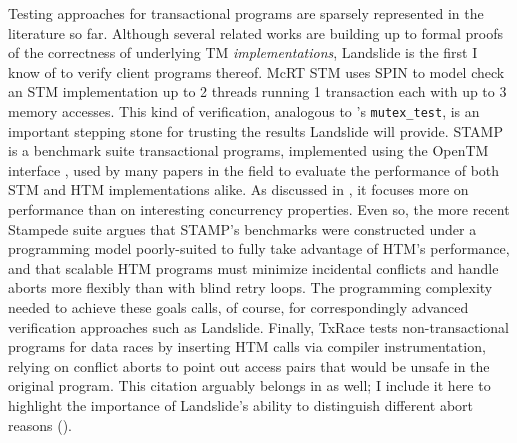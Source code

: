 Testing approaches for transactional programs are sparsely represented in the literature so far.
Although several related works \cite{tm-correctness,tm-completeness,specifying-verifying-tm}
are building up to formal proofs of the correctness of underlying TM {\em implementations},
Landslide is the first I know of to verify client programs thereof.
McRT STM \cite{mc-tm-with-spin} uses SPIN \cite{spin} to model check an STM implementation
up to 2 threads running 1 transaction each with up to 3 memory accesses.
This kind of verification,
analogous to \sect{\ref{sec:education-pebbles-tests}}'s {\tt mutex\_test},
is an important stepping stone for trusting the results Landslide will provide.
STAMP \cite{stamp} is a benchmark suite transactional programs,
implemented using the OpenTM interface \cite{opentm},
used by many papers in the field to evaluate the performance of both STM and HTM implementations alike.
As discussed in \sect{\ref{sec:tm-eval-exp-setup}},
it focuses more on performance than on interesting concurrency properties.
Even so, the more recent Stampede suite \cite{scalable-tm} argues that STAMP's benchmarks
were constructed under a programming model poorly-suited to fully take advantage of HTM's performance,
and that scalable HTM programs must
minimize incidental conflicts and handle aborts more flexibly than with blind retry loops.
The programming complexity needed to achieve these goals calls,
of course,
for correspondingly advanced verification approaches such as Landslide.
Finally, TxRace \cite{txrace}
tests non-transactional programs for data races
by inserting HTM calls via compiler instrumentation,
relying on conflict aborts to point out access pairs that would be unsafe in the original program.
This citation arguably belongs in \sect{\ref{sec:related-data-race}} as well;
I include it here to highlight the importance of Landslide's
ability to distinguish different abort reasons (\sect{\ref{sec:txn-abort-codes}}).

